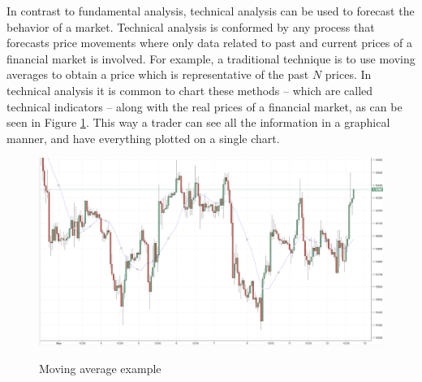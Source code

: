 In contrast to fundamental analysis, technical analysis can be used to forecast
the behavior of a market. Technical analysis is conformed by any process that
forecasts price movements where only data related to past and current prices of
a financial market is involved. For example, a traditional technique is to use
moving averages to obtain a price which is representative of the past $N$
prices. In technical analysis it is common to chart these methods -- which are
called technical indicators -- along with the real prices of a financial market,
as can be seen in Figure \ref{figure:moving-average-example}. This way a trader
can see all the information in a graphical manner, and have everything plotted
on a single chart.


\begin{figure}
  \caption{Moving average example} \centering
  \includegraphics[width=1.0\textwidth]{img/moving-average.png}
  \label{figure:moving-average-example}
\end{figure}

